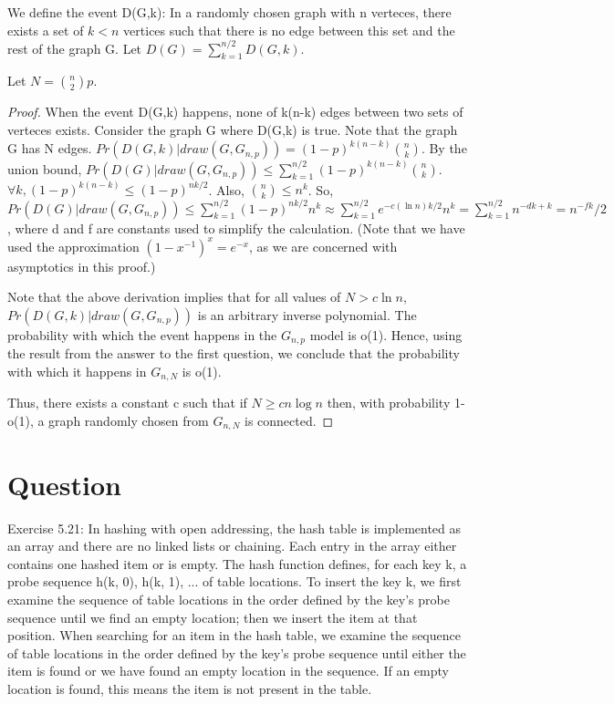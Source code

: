 \documentclass[10pt]{article}
\begin{document}
We define the event D(G,k): In a randomly chosen graph with n verteces, there exists a set of $k<n$ vertices such that there is no edge between this set and the rest of the graph G. Let $D(G)=\sum_{k=1}^{n/2}D(G,k)$.

Let $N=\binom{n}{2}p$.

\begin{proof}
When the event D(G,k) happens, none of k(n-k) edges between two sets of verteces exists. Consider the graph G where D(G,k) is true. Note that the graph G has N edges. $Pr(D(G,k)|draw(G, G_{n,p})) = (1-p)^{k(n-k)}\binom{n}{k}$. By the union bound, $Pr(D(G)|draw(G, G_{n,p})) \leq \sum_{k=1}^{n/2}(1-p)^{k(n-k)}\binom{n}{k}$. $\forall k, (1-p)^{k(n-k)} \leq (1-p)^{nk/2}$. Also, $\binom{n}{k} \leq n^{k}$. So, $Pr(D(G)|draw(G, G_{n,p})) \leq \sum_{k=1}^{n/2}(1-p)^{nk/2}n^{k} \approx \sum_{k=1}^{n/2}e^{-c(\ln n)k/2}n^{k} = \sum_{k=1}^{n/2}n^{-dk+k} = n^{-fk}/2$, where d and f are constants used to simplify the calculation. (Note that we have used the approximation $(1-x^{-1})^{x}=e^{-x}$, as we are concerned with asymptotics in this proof.)

Note that the above derivation implies that for all values of $N>c\ln n$, $Pr(D(G,k)|draw(G, G_{n,p}))$ is an arbitrary inverse polynomial. The probability with which the event happens in the $G_{n,p}$ model is o(1). Hence, using the result from the answer to the first question, we conclude that the probability with which it happens in $G_{n,N}$ is o(1).

Thus, there exists a constant c such that if $N\geq cn \log n$ then, with probability 1-o(1), a graph randomly chosen from $G_{n,N}$ is connected.
\end{proof}

\section{Question}
Exercise 5.21: In hashing with open addressing, the hash table is implemented as an array and there are no linked lists or chaining. Each entry in the array either contains one hashed item or is empty. The hash function defines, for each key k, a probe sequence h(k, 0), h(k, 1), ... of table locations. To insert the key k, we first examine the sequence of table locations in the order defined by the key's probe sequence until we find an empty location; then we insert the item at that position. When searching for an item in the hash table, we examine the sequence of table locations in the order defined by the key's probe sequence until either the item is found or we have found an empty location in the sequence. If an empty location is found, this means the item is not present in the table.
\end{document}
